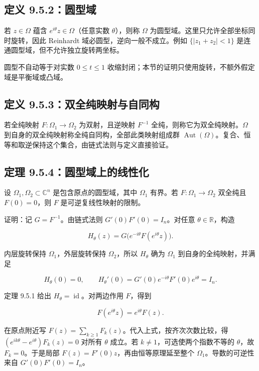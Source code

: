 \documentclass[11pt,a4paper]{article}
\begin{document}
\subsection{定义 9.5.2：圆型域}\label{ch09-s5-heading-3}

若 \(z\in\Omega\) 蕴含 \(e^{i\theta}z\in\Omega\)（任意实数
\(\theta\)），则称 \(\Omega\) 为圆型域。这里只允许全部坐标同时旋转，因此
Reinhardt 域必圆型，逆向一般不成立。例如 \(\{|z_1+z_2|<1\}\)
是连通圆型域，但不允许独立旋转两坐标。

圆型不自动等于对实数 \(0\le t\le1\)
收缩封闭；本节的证明只使用旋转，不额外假定域是平衡域或凸域。

\subsection{定义 9.5.3：双全纯映射与自同构}\label{ch09-s5-heading-4}

若全纯映射 \(F:\Omega_1\to\Omega_2\) 为双射，且逆映射 \(F^{-1}\)
全纯，则称它为双全纯映射。\(\Omega\)
到自身的双全纯映射称全纯自同构，全部此类映射组成群
\(\operatorname{Aut}(\Omega)\)。复合、恒等和取逆保持这个集合，由链式法则与定义直接验证。

\subsection{定理 9.5.4：圆型域上的线性化}\label{ch09-s5-heading-5}

设 \(\Omega_1,\Omega_2\subset\mathbb C^n\) 是包含原点的圆型域，其中
\(\Omega_1\) 有界。若 \(F:\Omega_1\to\Omega_2\) 双全纯且 \(F(0)=0\)，则
\(F\) 是可逆复线性映射的限制。

证明：记 \(G=F^{-1}\)。由链式法则 \(G'(0)F'(0)=I_n\)。对任意
\(\theta\in\mathbb R\)，构造

\[
H_\theta(z)=G\bigl(e^{-i\theta}F(e^{i\theta}z)\bigr).
\]

内层旋转保持 \(\Omega_1\)，外层旋转保持 \(\Omega_2\)，所以 \(H_\theta\)
确为 \(\Omega_1\) 到自身的全纯映射，并满足

\[
H_\theta(0)=0,\qquad
H_\theta'(0)=G'(0)e^{-i\theta}F'(0)e^{i\theta}=I_n.
\]

定理 9.5.1 给出 \(H_\theta=\operatorname{id}\)。对两边作用 \(F\)，得到

\[
F(e^{i\theta}z)=e^{i\theta}F(z).
\tag{9.5.4}
\]

在原点附近写 \(F(z)=\sum_{k\ge1}F_k(z)\)。代入上式，按齐次次数比较，得
\((e^{ik\theta}-e^{i\theta})F_k(z)=0\) 对所有 \(\theta\) 成立。若
\(k\ne1\)，可选使两个指数不等的 \(\theta\)，故 \(F_k=0\)。于是局部
\(F(z)=F'(0)z\)，再由恒等原理延至整个 \(\Omega_1\)。导数的可逆性来自
\(G'(0)F'(0)=I_n\)。
\end{document}
